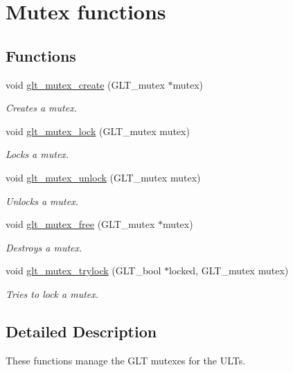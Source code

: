 \hypertarget{group__MUTEX}{\section{Mutex functions}
\label{group__MUTEX}
}
\subsection*{Functions}
\begin{DoxyCompactItemize}
\item 
void \hyperlink{group__MUTEX_ga2f230615e4d7f09011f7222b4ad0bb25}{glt\-\_\-mutex\-\_\-create} (G\-L\-T\-\_\-mutex $\ast$mutex)
\begin{DoxyCompactList}\small\item\em Creates a mutex. \end{DoxyCompactList}\item 
void \hyperlink{group__MUTEX_ga337c654c561a5f8a6f7c2dd0a7012650}{glt\-\_\-mutex\-\_\-lock} (G\-L\-T\-\_\-mutex mutex)
\begin{DoxyCompactList}\small\item\em Locks a mutex. \end{DoxyCompactList}\item 
void \hyperlink{group__MUTEX_gad18039d55ed2b243ef1a8904f2bf4082}{glt\-\_\-mutex\-\_\-unlock} (G\-L\-T\-\_\-mutex mutex)
\begin{DoxyCompactList}\small\item\em Unlocks a mutex. \end{DoxyCompactList}\item 
void \hyperlink{group__MUTEX_ga4e22bebb15e26d508d6283967a0d43f9}{glt\-\_\-mutex\-\_\-free} (G\-L\-T\-\_\-mutex $\ast$mutex)
\begin{DoxyCompactList}\small\item\em Destroys a mutex. \end{DoxyCompactList}\item 
void \hyperlink{group__MUTEX_ga6b91862c97da21affe0adeecceb616ad}{glt\-\_\-mutex\-\_\-trylock} (G\-L\-T\-\_\-bool $\ast$locked, G\-L\-T\-\_\-mutex mutex)
\begin{DoxyCompactList}\small\item\em Tries to lock a mutex. \end{DoxyCompactList}\end{DoxyCompactItemize}


\subsection{Detailed Description}
These functions manage the G\-L\-T mutexes for the U\-L\-Ts. 

